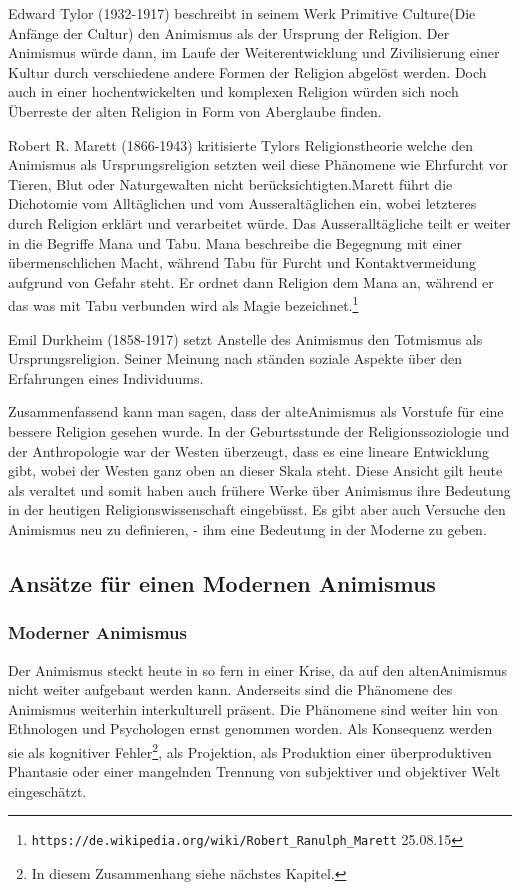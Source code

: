 Edward Tylor (1932-1917) beschreibt in seinem Werk \glqq Primitive Culture\grqq (Die Anfänge der Cultur) den Animismus als der Ursprung der Religion. Der Animismus würde dann, im Laufe der Weiterentwicklung und Zivilisierung einer Kultur durch verschiedene andere Formen der Religion abgelöst werden. Doch auch in einer hochentwickelten und komplexen Religion würden sich noch Überreste der alten Religion in Form von Aberglaube finden.

Robert R. Marett (1866-1943) kritisierte Tylors Religionstheorie welche den Animismus als Ursprungsreligion setzten weil diese Phänomene wie Ehrfurcht vor Tieren, Blut oder Naturgewalten nicht berücksichtigten.Marett führt die Dichotomie vom Alltäglichen und vom Ausseraltäglichen ein, wobei letzteres durch Religion erklärt und verarbeitet würde. Das Ausseralltägliche teilt er weiter in die Begriffe Mana und Tabu. Mana beschreibe die Begegnung mit einer übermenschlichen Macht, während Tabu für Furcht und Kontaktvermeidung aufgrund von Gefahr steht. Er ordnet dann Religion dem Mana an, während er das was mit Tabu verbunden wird als Magie bezeichnet.\footnote{\texttt{https://de.wikipedia.org/wiki/Robert\_Ranulph\_Marett} 25.08.15} 

Emil Durkheim (1858-1917) setzt Anstelle des Animismus den Totmismus als Ursprungsreligion. Seiner Meinung nach ständen soziale Aspekte über den Erfahrungen eines Individuums.

Zusammenfassend kann man sagen, dass der \glqq alte\grqq Animismus als Vorstufe für eine bessere Religion gesehen wurde. In der Geburtsstunde der Religionssoziologie und der Anthropologie war der Westen überzeugt, dass es eine lineare Entwicklung gibt, wobei der Westen ganz oben an dieser Skala steht. Diese Ansicht gilt heute als veraltet und somit haben auch frühere Werke über Animismus ihre Bedeutung in der heutigen Religionswissenschaft eingebüsst. Es gibt aber auch Versuche den Animismus neu zu definieren, - ihm eine Bedeutung in der Moderne zu geben. 

\subsection{Ansätze für einen Modernen Animismus}
\subsubsection*{Moderner Animismus}
Der Animismus steckt heute in so fern in einer Krise, da auf den \glqq alten\grqq Animismus nicht weiter aufgebaut werden kann. Anderseits sind die Phänomene des Animismus weiterhin interkulturell präsent. Die Phänomene sind weiter hin von Ethnologen und Psychologen ernst genommen worden. Als Konsequenz werden sie als kognitiver Fehler\footnote{In diesem Zusammenhang siehe nächstes Kapitel.}, als Projektion, als Produktion einer überproduktiven Phantasie oder einer mangelnden Trennung von subjektiver und objektiver Welt eingeschätzt. 

